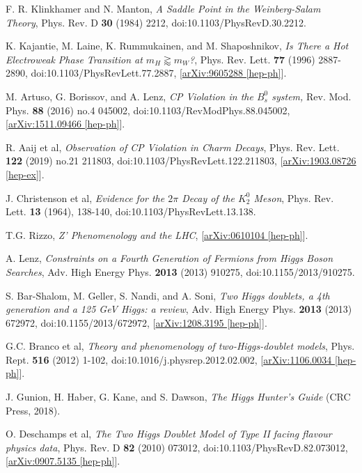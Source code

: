 \documentclass[a4paper,12pt]{article}
\begin{document}
\begin{thebibliography}{99}
F. R. Klinkhamer and N. Manton, \emph{A Saddle Point in the Weinberg-Salam Theory}, Phys. Rev. D \textbf{30} (1984) 2212, doi:10.1103/PhysRevD.30.2212.

K. Kajantie, M. Laine, K. Rummukainen, and M. Shaposhnikov, \emph{Is There a Hot Electroweak Phase Transition at $m_H\gtrapprox m_W$?}, Phys. Rev. Lett. \textbf{77} (1996) 2887-2890, doi:10.1103/PhysRevLett.77.2887, [\href{https://arxiv.org/abs/hep-ph/9605288}{arXiv:9605288 [hep-ph]}].

M. Artuso, G. Borissov, and A. Lenz, \emph{CP Violation in the $B_s^0$ system,} Rev. Mod. Phys. \textbf{88} (2016) no.4 045002, doi:10.1103/RevModPhys.88.045002, [\href{https://arxiv.org/abs/1511.09466}{arXiv:1511.09466 [hep-ph]}].

R. Aaij et al, \emph{Observation of CP Violation in Charm Decays}, Phys. Rev. Lett. \textbf{122} (2019) no.21 211803, doi:10.1103/PhysRevLett.122.211803, [\href{https://arxiv.org/abs/1903.08726}{arXiv:1903.08726 [hep-ex]}].

J. Christenson et al, \emph{Evidence for the $2\pi$ Decay of the $K_2^0$ Meson}, Phys. Rev. Lett. \textbf{13} (1964), 138-140, doi:10.1103/PhysRevLett.13.138.

T.G. Rizzo, \emph{Z' Phenomenology and the LHC}, [\href{https://arxiv.org/abs/hep-ph/0610104}{arXiv:0610104 [hep-ph]}].

A. Lenz, \emph{Constraints on a Fourth Generation of Fermions from Higgs Boson Searches}, Adv. High Energy Phys. \textbf{2013} (2013) 910275, doi:10.1155/2013/910275.

S. Bar-Shalom, M. Geller, S. Nandi, and A. Soni, \emph{Two Higgs doublets, a 4th generation and a 125 GeV Higgs: a review}, Adv. High Energy Phys. \textbf{2013} (2013) 672972, doi:10.1155/2013/672972, [\href{https://arxiv.org/abs/1208.3195v2}{arXiv:1208.3195 [hep-ph]}].

G.C. Branco et al, \emph{Theory and phenomenology of two-Higgs-doublet models}, Phys. Rept. \textbf{516} (2012) 1-102, doi:10.1016/j.physrep.2012.02.002, [\href{https://arxiv.org/pdf/1106.0034.pdf}{arXiv:1106.0034 [hep-ph]}].

J. Gunion, H. Haber, G. Kane, and S. Dawson, \emph{The Higgs Hunter's Guide} (CRC Press, 2018).

O. Deschamps et al, \emph{The Two Higgs Doublet Model of Type II facing flavour physics data}, Phys. Rev. D \textbf{82} (2010) 073012, doi:10.1103/PhysRevD.82.073012, [\href{https://arxiv.org/abs/0907.5135}{arXiv:0907.5135 [hep-ph]}].


\end{thebibliography}
\end{document}
